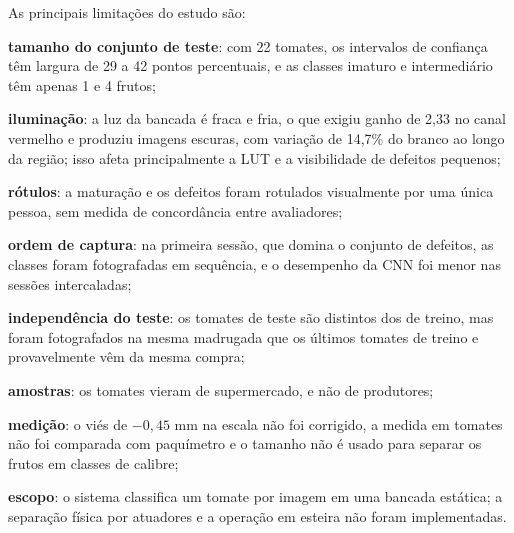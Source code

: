 As principais limitações do estudo são:
\begin{alineas}
	\item \textbf{tamanho do conjunto de teste}: com 22 tomates, os intervalos de confiança têm largura de 29 a 42 pontos percentuais, e as classes imaturo e intermediário têm apenas 1 e 4 frutos;
	\item \textbf{iluminação}: a luz da bancada é fraca e fria, o que exigiu ganho de 2,33 no canal vermelho e produziu imagens escuras, com variação de 14,7\% do branco ao longo da região; isso afeta principalmente a LUT e a visibilidade de defeitos pequenos;
	\item \textbf{rótulos}: a maturação e os defeitos foram rotulados visualmente por uma única pessoa, sem medida de concordância entre avaliadores;
	\item \textbf{ordem de captura}: na primeira sessão, que domina o conjunto de defeitos, as classes foram fotografadas em sequência, e o desempenho da CNN foi menor nas sessões intercaladas;
	\item \textbf{independência do teste}: os tomates de teste são distintos dos de treino, mas foram fotografados na mesma madrugada que os últimos tomates de treino e provavelmente vêm da mesma compra;
	\item \textbf{amostras}: os tomates vieram de supermercado, e não de produtores;
	\item \textbf{medição}: o viés de $-0{,}45$ mm na escala não foi corrigido, a medida em tomates não foi comparada com paquímetro e o tamanho não é usado para separar os frutos em classes de calibre;
	\item \textbf{escopo}: o sistema classifica um tomate por imagem em uma bancada estática; a separação física por atuadores e a operação em esteira não foram implementadas.
\end{alineas}
